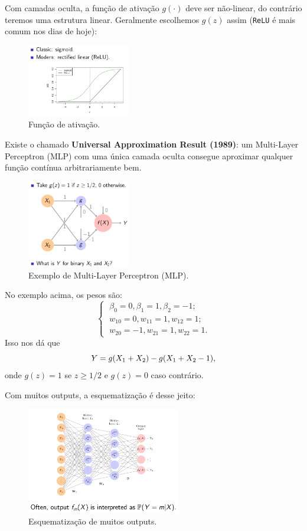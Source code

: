 \documentclass[a4paper,fleqn,12pt]{article}
\begin{document}
Com camadas oculta, a função de ativação $g(\cdot)$ deve ser não-linear, do contrário teremos uma estrutura linear. Geralmente escolhemos $g(z)$ assim (\texttt{ReLU} é mais comum nos dias de hoje):
\begin{figure}[H]
\centering
\includegraphics[width=0.4\textwidth]{fig/activation_function.png}
\caption{Função de ativação.}
\label{fig:units_activation_functions}
\end{figure}

Existe o chamado \textbf{Universal Approximation Result (1989)}: um Multi-Layer Perceptron (MLP) com uma única camada oculta consegue aproximar qualquer função contínua arbitrariamente bem.
\begin{figure}[H]
\centering
\includegraphics[width=0.4\textwidth]{fig/example_mlp.png}
\caption{Exemplo de Multi-Layer Perceptron (MLP).}
\label{fig:example_mlp}
\end{figure}

No exemplo acima, os pesos são:
$$
\begin{cases}
\; \beta_0 = 0, \beta_1 = 1, \beta_2 = -1; \\
\; w_{10} = 0 , w_{11} = 1, w_{12} = 1; \\
\; w_{20} = -1, w_{21} = 1, w_{22} = 1.
\end{cases}
$$
Isso nos dá que
$$
Y = g\qty(X_1 + X_2) - g\qty(X_1 + X_2 - 1),
$$
onde $g(z) = 1$ se $z \geq 1/2$ e $g(z) = 0$ caso contrário.

Com muitos outputs, a esquematização é desse jeito:
\begin{figure}[H]
\centering
\includegraphics[width=0.6\textwidth]{fig/many_outputs.png}
\caption{Esquematização de muitos outputs.}
\label{fig:many_outputs}
\end{figure}
\end{document}
